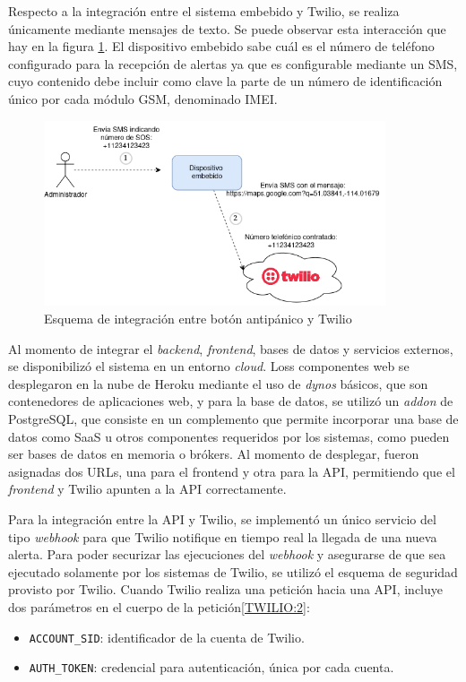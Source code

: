 Respecto a la integración entre el sistema embebido y Twilio, se realiza únicamente mediante mensajes de texto. Se puede observar esta interacción que hay en la figura \ref{integracion:1}. El dispositivo embebido sabe cuál es el número de teléfono configurado para la recepción de alertas ya que es configurable mediante un SMS, cuyo contenido debe incluir como clave la parte de un número de identificación único por cada módulo GSM, denominado IMEI\citep{IMEI:1}.

\begin{figure}[H]
	\centering
	\includegraphics[width=0.9\textwidth]{./Figures/integracion-1.png}
	\caption{Esquema de integración entre botón antipánico y Twilio}
	\label{integracion:1}
\end{figure}

Al momento de integrar el \textit{backend}, \textit{frontend}, bases de datos y servicios externos, se disponibilizó el sistema en un entorno \textit{cloud}. Loss componentes web se desplegaron en la nube de Heroku mediante el uso de \textit{dynos} básicos, que son contenedores de aplicaciones web\citep{HEROKU:1}, y para la base de datos, se utilizó un \textit{addon} de PostgreSQL, que consiste en un complemento que permite incorporar una base de datos como SaaS u otros componentes requeridos por los sistemas, como pueden ser bases de datos en memoria o brókers\citep{HEROKU:2}. Al momento de desplegar, fueron asignadas dos URLs, una para el frontend y otra para la API, permitiendo que el \textit{frontend} y Twilio apunten a la API correctamente.

Para la integración entre la API y Twilio, se implementó un único servicio del tipo \textit{webhook} para que Twilio notifique en tiempo real la llegada de una nueva alerta. Para poder securizar las ejecuciones del \textit{webhook} y asegurarse de que sea ejecutado solamente por los sistemas de Twilio, se utilizó el esquema de seguridad provisto por Twilio. Cuando Twilio realiza una petición hacia una API, incluye dos parámetros en el cuerpo de la petición\ref{TWILIO:2}:
\begin{itemize}
	\item \texttt{ACCOUNT\_SID}: identificador de la cuenta de Twilio.
	\item \texttt{AUTH\_TOKEN}: credencial para autenticación, única por cada cuenta.
\end{itemize}

